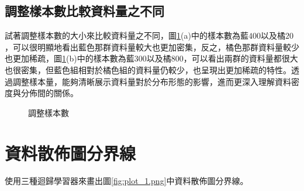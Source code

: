 \documentclass[12pt, a4paper]{article}
\begin{document}
\subsection{調整樣本數比較資料量之不同}
試著調整樣本數的大小來比較資料量之不同，圖\;\ref{fig:parallel4_4}\;(a)\;中的樣本數為藍\;$400$\;以及橘\;$20$\;，可以很明顯地看出藍色那群資料量較大也更加密集，反之，橘色那群資料量較少也更加稀疏，圖\;\ref{fig:parallel4_4}\;(b)\;中的樣本數為藍\;$300$\;以及橘\;$800$\;，可以看出兩群的資料量都很大也很密集，但藍色組相對於橘色組的資料量仍較少，也呈現出更加稀疏的特性。透過調整樣本量，能夠清晰展示資料量對於分布形態的影響，進而更深入理解資料密度與分佈間的關係。

\begin{figure}[H]
\centering
{}
\caption{調整樣本數}
\label{fig:parallel4_4}
\end{figure}

\section{資料散佈圖分界線}
使用三種迴歸學習器來畫出圖\;\ref{fig:plot_1.png}\;中資料散佈圖分界線。
\end{document}
